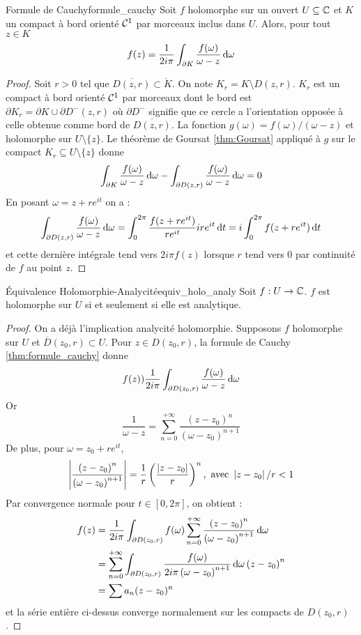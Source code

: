 \documentclass{cours}
\begin{document}
\begin{théorème}{Formule de Cauchy}{formule_cauchy}
    Soit $f$ holomorphe sur un ouvert $U \subseteq \mathbb{C}$ et $K$ un compact à bord orienté $\mathcal{C}^{1}$ par morceaux inclus dans $U$. Alors, pour tout $z \in K$ 
    \[
        f(z) = \frac{1}{2i\pi}\int_{\partial K}\frac{f(\omega)}{\omega -  z}{\rm \, d} \omega
    \]
\end{théorème}
\begin{proof}
    Soit $r > 0$ tel que $\overline{D(z, r)} \subset \mathring{K}$. On note $K_{r} = K \setminus D(z, r)$. $K_{r}$ est un compact à bord orienté $\mathcal{C}^{1}$ par morceaux dont le bord est $\partial K_{r} = \partial K \cup \partial D^{-}(z, r)$ où $\partial D^{-}$ signifie que ce cercle a l'orientation opposée à celle obtenue comme bord de $\overline{D(z,r)}$. La fonction $g(\omega) = f(\omega)/\left(\omega - z\right)$ et holomorphe sur $U \setminus \{z\}$. Le théorème de Goursat \ref{thm:Goursat} appliqué à $g$ sur le compact $K_{r} \subseteq U \setminus \{z\}$ donne 
    \[
        \int_{\partial K}\frac{f(\omega)}{\omega - z}{\rm \, d} \omega - \int_{\partial D(z, r)} \frac{f(\omega)}{\omega - z}{\rm \, d} \omega = 0
    \]
    En posant $\omega = z + re^{it}$ on a : 
    \[
        \int_{\partial D(z, r)}\frac{f(\omega)}{\omega - z}{\rm \, d} \omega = \int_{0}^{2\pi}\frac{f(z + re^{it})}{re^{it}}ire^{it}{\rm \, d} t = i \int_{0}^{2\pi}f(z + re^{it}) {\rm \, d} t
    \]
    et cette dernière intégrale tend vers $2i\pi f(z)$ lorsque $r$ tend vers $0$ par continuité de $f$ au point $z$. 
\end{proof}
\begin{théorème}{Équivalence Holomorphie-Analycité}{equiv_holo_analy}
    Soit $f : U \to \mathbb{C}$. $f$ est holomorphe sur $U$ si et seulement si elle est analytique.
\end{théorème}
\begin{proof}
    On a déjà l'implication analycité holomorphie. Supposons $f$ holomorphe sur $U$ et $\overline{D}(z_{0}, r) \subset U$. Pour $z \in D(z_{0}, r)$, la formule de Cauchy \ref{thm:formule_cauchy} donne 
    \[
        f(z) ) \frac{1}{2i\pi}\int_{\partial D(z_{0}, r)}\frac{f(\omega)}{\omega - z}{\rm \, d} \omega
    \]
    Or 
    \[
        \frac{1}{\omega - z} = \sum_{n = 0}^{+ \infty}\frac{\left(z - z_{0}\right)^{n}}{\left(\omega - z_{0}\right)^{n + 1}}
    \]
    De plus, pour $\omega = z_{0} + re^{it}$,
    \[
        \left|\frac{\left(z - z_{0}\right)^{n}}{\left(\omega - z_{0}\right)^{n + 1}}\right| = \frac{1}{r}\left(\frac{\left|z - z_{0}\right|}{r}\right)^{n}, \text{ avec } \left|z - z_{0}\right|/r < 1
    \]
    Par convergence normale pour $t \in [0, 2\pi]$, on obtient :
    \[
        \begin{aligned}
            f(z) &= \frac{1}{2i\pi}\int_{\partial D(z_{0},r )}f(\omega)\sum_{n = 0}^{+ \infty}\frac{\left(z - z_{0}\right)^{n}}{\left(\omega - z_{0}\right)^{n + 1}}{\rm \, d} \omega \\ &= \sum_{n = 0}^{+ \infty}\int_{\partial D(z_{0}, r)}\frac{f(\omega)}{2i\pi\left(\omega - z_{0}\right)^{n + 1}}{\rm \, d} \omega\left(z - z_{0}\right)^{n} \\ &= \sum a_{n}(z - z_{0})^{n}
        \end{aligned}
    \]
    et la série entière ci-dessus converge normalement sur les compacts de $D(z_{0}, r)$.
\end{proof}
\end{document}
